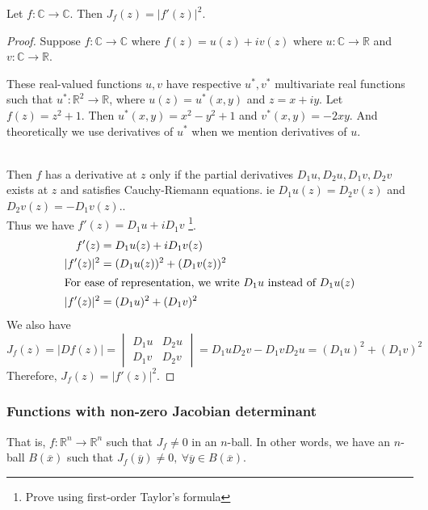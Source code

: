 \begin{theorem}
	Let $f : \mathbb{C} \to \mathbb{C}$.
	Then $J_f(z) = |f'(z)|^2$.
\end{theorem}
\begin{proof}
	Suppose $f : \mathbb{C} \to \mathbb{C}$ where $f(z) = u(z) + iv(z)$ where $u : \mathbb{C} \to \mathbb{R}$ and $v : \mathbb{C} \to \mathbb{R}$.
	\begin{commentary}These real-valued functions $u,v$ have respective $u^*,v^*$ multivariate real functions such that $u^* : \mathbb{R}^2 \to \mathbb{R}$, where $u(z) = u^*(x,y)$ and $z = x+iy$.
	Let $f(z) = z^2+1$.
	Then $u^*(x,y) = x^2-y^2+1$ and $v^*(x,y) = -2xy$.
	And theoretically we use derivatives of $u^*$ when we mention derivatives of $u$.\end{commentary}\\

	Then $f$ has a derivative at $z$ only if the partial derivatives $D_1u,D_2u,D_1v,D_2v$ exists at $z$ and satisfies Cauchy-Riemann equations.
	ie $D_1u(z) = D_2v(z)$ and $D_2v(z) = -D_1v(z)$.\cite[Theorem 5.22]{apostol}.\\
		
	Thus we have $f'(z) = D_1u + iD_1v$ \cite[Theorem 12.6]{apostol}\footnote{Prove using first-order Taylor's formula}.
	\begin{align*}
		f'(z) & = D_1u(z) + iD_1v(z) \\
		|f'(z)|^2 & = (D_1u(z))^2 + (D_1v(z))^2\\
		\intertext{For ease of representation, we write $D_1u$ instead of $D_1u(z)$}
		|f'(z)|^2 & = (D_1u)^2 + (D_1v)^2
	\end{align*}
	We also have
	\[ J_f(z) = |Df(z)| = \begin{vmatrix} D_1u & D_2u \\ D_1v & D_2v \end{vmatrix} = D_1uD_2v - D_1vD_2u = (D_1u)^2 + (D_1v)^2 \]
	Therefore, $J_f(z) = |f'(z)|^2$.
\end{proof}
\subsubsection{Functions with non-zero Jacobian determinant}
\begin{commentary}
	That is, $f : \mathbb{R}^n \to \mathbb{R}^n$ such that $J_f \ne 0$ in an $n$-ball. In other words, we have an $n$-ball $B(\overline{x})$ such that $J_f(\overline{y}) \ne 0,\ \forall \overline{y} \in B(\overline{x})$.
\end{commentary}

